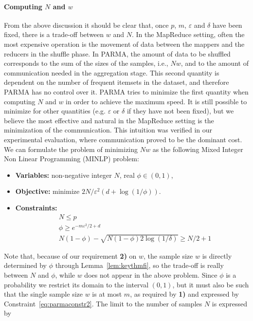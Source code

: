 \paragraph*{Computing $N$ and $w$} From the above discussion it should be clear
that, once $p$, $m$, $\varepsilon$ and $\delta$ have been fixed, there is a
trade-off between $w$ and $N$. In the MapReduce setting, often the most expensive
operation is the movement of data between the mappers and the reducers in the
shuffle phase. In PARMA, the amount of data to be shuffled corresponds to the
sum of the sizes of the samples, i.e., $Nw$, and to the amount of
communication needed in the aggregation stage. This second quantity is dependent
on the number of frequent itemsets in the dataset, and therefore PARMA has no
control over it. PARMA tries to minimize the first quantity when computing $N$ and
$w$ in order to achieve the maximum speed. It is still possible to minimize for
other quantities (e.g. $\varepsilon$ or $\delta$ if they have not been fixed),
but we believe the most effective and natural in the MapReduce setting is the
minimization of the communication.  This intuition was verified in our
experimental evaluation, where communication proved to be the dominant cost. We
can formulate the problem of minimizing $Nw$ as the following Mixed Integer Non
Linear Programming (MINLP) problem:
\begin{itemize}
  \item {\bf Variables:} non-negative integer $N$, real $\phi\in(0,1)$,
  \item {\bf Objective:} minimize $2N/\varepsilon^2 (d+\log(1/\phi))$.
  \item {\bf Constraints:}
    \begin{align}
      &N \le p \label{eq:parmaconstr1}\\
      &\phi \ge e^{-m\varepsilon^2/2 + d} \label{eq:parmaconstr2}\\
      &N(1-\phi)-\sqrt{N(1-\phi)2\log(1/\delta)} \ge N/2 + 1 \label{eq:parmaconstr3}
    \end{align}
\end{itemize}
Note that, because of our requirement {\bf 2)} on $w$, the sample size $w$ is directly
determined by $\phi$ through Lemma~\ref{lem:keythmfi}, so the trade-off is
really between $N$ and $\phi$, while $w$ does not appear in the above problem.
Since $\phi$ is a probability we restrict its
domain to the interval $(0,1)$, but it must also be such that the single sample size
$w$ is at most $m$, as required by {\bf 1)} and expressed by
Constraint~\eqref{eq:parmaconstr2}. The limit to the number of samples $N$ is expressed by
